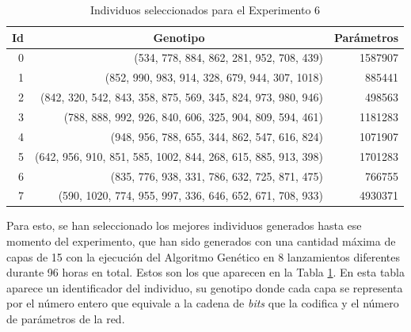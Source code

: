 \begin{table}[h]
\caption{Individuos seleccionados para el Experimento 6}
\label{tab:mejores_ind_exp6}
\centering
\begin{tabular}{r|r|r}
\toprule
\multicolumn{1}{c|}{\textbf{Id}} & \multicolumn{1}{c|}{\textbf{Genotipo}}                        & \multicolumn{1}{c}{\textbf{Parámetros}} \\ \hline
0                                & (534, 778, 884, 862, 281, 952, 708, 439)                      & 1587907                                      \\
1                                & (852, 990, 983, 914, 328, 679, 944, 307, 1018)                & 885441                                      \\
2                                & (842, 320, 542, 843, 358, 875, 569, 345, 824, 973, 980, 946)  & 498563                                      \\
3                                & (788, 888, 992, 926, 840, 606, 325, 904, 809, 594, 461)       & 1181283                                     \\
4                                & (948, 956, 788, 655, 344, 862, 547, 616, 824)                 & 1071907                                      \\
5                                & (642, 956, 910, 851, 585, 1002, 844, 268, 615, 885, 913, 398) & 1701283                                      \\
6                                & (835, 776, 938, 331, 786, 632, 725, 871, 475)                 & 766755                                      \\
7                                & (590, 1020, 774, 955, 997, 336, 646, 652, 671, 708, 933)      & 4930371   \\
\bottomrule
\end{tabular}
\end{table}

Para esto, se han seleccionado los mejores individuos generados hasta ese momento del experimento, que han sido generados con una cantidad máxima de capas de 15 con la ejecución del Algoritmo Genético en 8 lanzamientos diferentes durante 96 horas en total. Estos son los que aparecen en la Tabla \ref{tab:mejores_ind_exp6}. En esta tabla aparece un identificador del individuo, su genotipo donde cada capa se representa por el número entero que equivale a la cadena de \textit{bits} que la codifica y el número de parámetros de la red.


